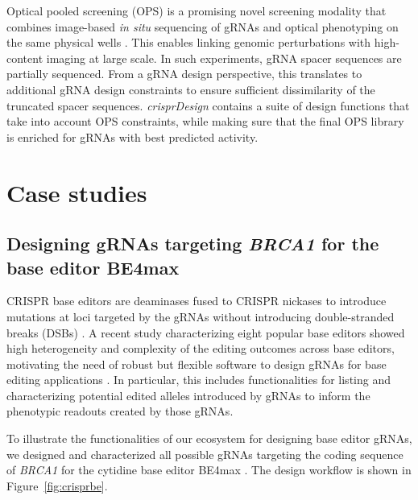\documentclass[pdftex,english,10pt]{article}
\begin{document}
Optical pooled screening (OPS) is a promising novel screening modality that combines image-based \textit{in situ} sequencing of gRNAs and optical phenotyping on the same physical wells \citep{ops}. This enables linking genomic perturbations with high-content imaging at large scale. In such experiments, gRNA spacer sequences are partially sequenced. From a gRNA design perspective, this translates to additional gRNA design constraints to ensure sufficient dissimilarity of the truncated spacer sequences.  \textit{crisprDesign} contains a suite of design functions that take into account OPS constraints, while making sure that the final OPS library is enriched for gRNAs with best predicted activity. 




\section{Case studies}



\subsection{Designing gRNAs targeting \textit{BRCA1} for the base editor BE4max} 

CRISPR base editors are deaminases fused to CRISPR nickases to introduce mutations at loci targeted by the gRNAs without introducing double-stranded breaks (DSBs) \cite{gaudelli,komor}. A recent study characterizing eight popular base editors showed high heterogeneity and complexity of the editing outcomes across base editors, motivating the need of robust but flexible software to design gRNAs for base editing applications \citep{behive}. In particular, this includes functionalities for listing and characterizing potential edited alleles introduced by gRNAs to inform the phenotypic readouts created by those gRNAs.

To illustrate the functionalities of our ecosystem for designing base editor gRNAs, we designed and characterized all possible gRNAs targeting the coding sequence of \textit{BRCA1} for the cytidine base editor BE4max \citep{koblan2018improving}. The design workflow is shown in Figure~\ref{fig:crisprbe}. 
\end{document}
